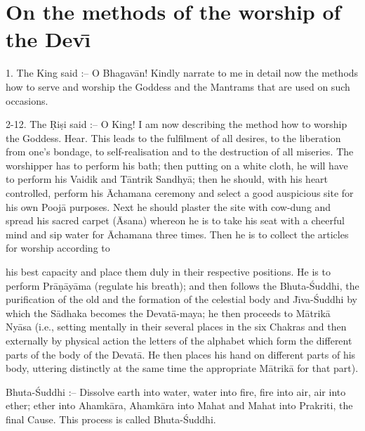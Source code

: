 \chapter{On the methods of the worship of the Dev\={\i}}

1. The King said :-- O Bhagav\=an! Kindly narrate to me in detail now the methods how to serve and worship the Goddess and the Mantrams that are used on such occasions.

2-12. The \d{R}i\d{s}i said :-- O King! I am now describing the method how to worship the Goddess. Hear. This leads to the fulfilment of all desires, to the liberation from one's bondage, to self-realisation and to the destruction of all miseries. The worshipper has to perform his bath; then putting on a white cloth, he will have to perform his Vaidik and T\=antrik Sandhy\=a; then he should, with his heart controlled, perform his \=Achamana ceremony and select a good auspicious site for his own Pooj\=a purposes. Next he should plaster the site with cow-dung and spread his sacred carpet (\=Asana) whereon he is to take his seat with a cheerful mind and sip water for \=Achamana three times. Then he is to collect the articles for worship according to

his best capacity and place them duly in their respective positions. He is to perform Pr\=a\d{n}\=ay\=ama (regulate his breath); and then follows the Bhuta-\'Suddhi, the purification of the old and the formation of the celestial body and J\={\i}va-\'Suddhi by which the S\=adhaka becomes the Devat\=a-maya; he then proceeds to M\=atrik\=a Ny\=asa (i.e., setting mentally in their several places in the six Chakras and then externally by physical action the letters of the alphabet which form the different parts of the body of the Devat\=a. He then places his hand on different parts of his body, uttering distinctly at the same time the appropriate M\=atrik\=a for that part).

Bhuta-\'Suddhi :-- Dissolve earth into water, water into fire, fire into air, air into ether; ether into Ahamk\=ara, Ahamk\=ara into Mahat and Mahat into Prakriti, the final Cause. This process is called Bhuta-\'Suddhi.

